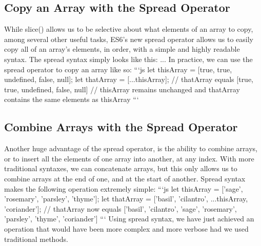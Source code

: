 \documentclass{article}%
\begin{document}
%
\subsection{Copy an Array with the Spread Operator}%
\label{subsec:CopyanArraywiththeSpreadOperator}%
While slice() allows us to be selective about what elements of an array to copy, among several other useful tasks, ES6's new spread operator allows us to easily copy all of an array's elements, in order, with a simple and highly readable syntax. The spread syntax simply looks like this: ...\newline%
In practice, we can use the spread operator to copy an array like so:\newline%
```js\newline%
let thisArray = {[}true, true, undefined, false, null{]};\newline%
let thatArray = {[}...thisArray{]};\newline%
// thatArray equals {[}true, true, undefined, false, null{]}\newline%
// thisArray remains unchanged and thatArray contains the same elements as thisArray\newline%
```\newline%

%
\subsection{Combine Arrays with the Spread Operator}%
\label{subsec:CombineArrayswiththeSpreadOperator}%
Another huge advantage of the spread operator, is the ability to combine arrays, or to insert all the elements of one array into another, at any index. With more traditional syntaxes, we can concatenate arrays, but this only allows us to combine arrays at the end of one, and at the start of another. Spread syntax makes the following operation extremely simple:\newline%
```js\newline%
let thisArray = {[}'sage', 'rosemary', 'parsley', 'thyme'{]};\newline%
let thatArray = {[}'basil', 'cilantro', ...thisArray, 'coriander'{]};\newline%
// thatArray now equals {[}'basil', 'cilantro', 'sage', 'rosemary', 'parsley', 'thyme', 'coriander'{]}\newline%
```\newline%
Using spread syntax, we have just achieved an operation that would have been more complex and more verbose had we used traditional methods.\newline%
\end{document}
